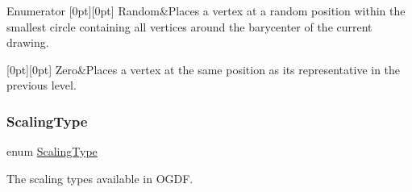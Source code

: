 \begin{DoxyEnumFields}{Enumerator}
[0pt][0pt]{}\mbox{\label{layout_8hh_a93e50260439be3f5fe75b271c0ce2c96a64663f4646781c9c0110838b905daa23}} 
Random&Places a vertex at a random position within the smallest circle containing all vertices around the barycenter of the current drawing. \\
\hline

[0pt][0pt]{}\mbox{\label{layout_8hh_a93e50260439be3f5fe75b271c0ce2c96ad7ed4ee1df437474d005188535f74875}} 
Zero&Places a vertex at the same position as its representative in the previous level. \\
\hline

\end{DoxyEnumFields}
\mbox{\label{layout_8hh_ae327227c361ab0e868a1f25017cb3ae2}} 
\subsubsection{\texorpdfstring{Scaling\+Type}{ScalingType}}
{\footnotesize\ttfamily enum \hyperlink{layout_8hh_ae327227c361ab0e868a1f25017cb3ae2}{Scaling\+Type}\hspace{0.3cm}{\ttfamily [strong]}}



The scaling types available in O\+G\+DF. 

